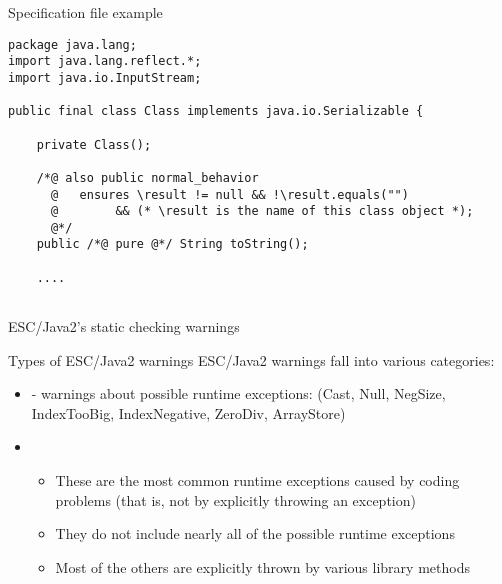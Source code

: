 \documentclass[
pdf,
nocolorBG,
slideColor,
cok,
]{prosper}
\newcommand{\bsl}{\char'134}
\newcommand{\result}{\bsl result}
\begin{document}
\begin{slide}{Specification file example}
\vspace*{-6ex}
\tiny
\begin{verbatim}
package java.lang;
import java.lang.reflect.*;
import java.io.InputStream;

public final class Class implements java.io.Serializable {

    private Class();

    /*@ also public normal_behavior
      @   ensures \result != null && !\result.equals("")
      @        && (* \result is the name of this class object *);
      @*/
    public /*@ pure @*/ String toString();

    ....


\end{verbatim}
\end{slide}


\begin{slide}{}

\vspace*{0ex}
\begin{center}{\large \red ESC/Java2's static checking warnings}\end{center}
\end{slide}


\begin{slide}{Types of ESC/Java2 warnings}
\vspace*{-6ex}
ESC/Java2 warnings fall into various categories:
\begin{itemize}
\item[] - warnings about possible {\knalblue runtime exceptions}:
(Cast, Null, NegSize, IndexTooBig, IndexNegative, ZeroDiv, ArrayStore)
\item[]
\begin{itemize}
\item These are the most common runtime exceptions caused by coding problems (that is, not by 
explicitly throwing an exception)
\item They do not include nearly all of the possible runtime exceptions
\item Most of the others are explicitly thrown by various library methods
\end{itemize}
\end{itemize}
\end{slide}
\end{document}
